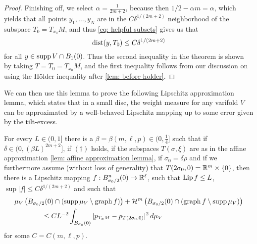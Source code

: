 \begin{proof}
Finishing off, we select $\alpha = \frac{1}{2m+2}$, because then $1/2-\alpha m = \alpha$, which yields that all points $y_1, \dots, y_N$ are in the $C\delta^{1/(2m+2)}$ neighborhood of the subspace $T_0=T_{x_0}M$, and thus \eqref{eq: helpful subsets} gives us that
\[
    \operatorname{dist}(y,T_0) \le C\delta^{1/(2m+2)}
\]
for all $y \in \operatorname{supp} V \cap B_1(0)$. Thus the second inequality in the theorem is shown by taking $T=T_0 = T_{x_0}M$, and the first inequality follows from our discussion on using the Hölder inequality after \cref{lem: before holder}.
\end{proof}

We can then use this lemma to prove the following Lipschitz approximation lemma, which states that in a small disc, the weight measure for any varifold $V$ can be approximated by a well-behaved Lipschitz mapping up to some error given by the tilt-excess.
\begin{lemma}\label{lem: lipschitz approximation lemma}
For every $L \in (0,1]$ there is a $\beta=\beta(m,\ell,p) \in (0,\frac{1}{4}]$ such that if $\delta \in (0,(\beta L)^{2m+2}]$, if $(\dagger)$ holds, if the subspaces $T(\sigma,\xi)$ are as in the affine approximation \cref{lem: affine approximation lemma}, if $\sigma_0 = \delta \rho$ and if we furthermore assume (without loss of generality) that $T(2\sigma_0,0) = \mathbb{R}^m \times \{0\}$, then there is a Lipschitz mapping $f:B_{\sigma_0/2}^n (0) \to \mathbb{R}^{\ell}$, such that $\operatorname{Lip} f \le L$, $\sup|f| \le C\delta^{1/(2m+2)}$ and such that
\begin{align*}
    &\mu_V\left( B_{\sigma_0/2}(0) \cap (\operatorname{supp} \mu_V \setminus \operatorname{graph} f) \right) + \mathcal{H}^m \left( B_{\sigma_0/2}(0) \cap (\operatorname{graph} f \setminus \operatorname{supp} \mu_V) \right)\\
    &\qquad\qquad \le CL^{-2} \int_{B_{\sigma_0}(0)} |p_{T_xM} - p_{T(2\sigma_0,0)} |^2 \, d\mu_V
\end{align*}
for some $C=C(m,\ell,p)$.
\end{lemma}
